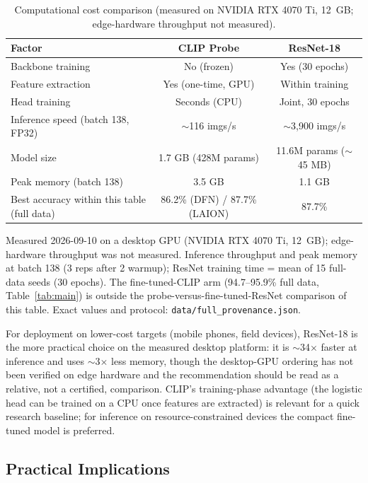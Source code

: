 \documentclass[10pt,a4paper]{article}
\begin{document}
\begin{table}[!ht]
\centering
\caption{Computational cost comparison (measured on NVIDIA RTX 4070 Ti, 12~GB; edge-hardware throughput not measured).}
\label{tab:cost}
\small
\begin{tabular}{lcc}
\toprule
\textbf{Factor} & \textbf{CLIP Probe} & \textbf{ResNet-18} \\
\midrule
Backbone training & No (frozen) & Yes (30 epochs) \\
Feature extraction & Yes (one-time, GPU) & Within training \\
Head training & Seconds (CPU) & Joint, 30 epochs \\
Inference speed (batch 138, FP32) & $\sim$116 imgs/s & $\sim$3{,}900 imgs/s \\
Model size & 1.7 GB (428M params) & 11.6M params ($\sim$45 MB) \\
Peak memory (batch 138) & 3.5 GB & 1.1 GB \\
\midrule
Best accuracy within this table (full data) & 86.2\% (DFN) / 87.7\% (LAION) & 87.7\% \\
\bottomrule
\end{tabular}
\smallskip
{\small Measured 2026-09-10 on a desktop GPU (NVIDIA RTX 4070 Ti, 12~GB); edge-hardware throughput was not measured. Inference throughput and peak memory at batch 138 (3 reps after 2 warmup); ResNet training time = mean of 15 full-data seeds (30 epochs). The fine-tuned-CLIP arm (94.7--95.9\% full data, Table~\ref{tab:main}) is outside the probe-versus-fine-tuned-ResNet comparison of this table. Exact values and protocol: \texttt{data/full\_provenance.json}.}
\end{table}

For deployment on lower-cost targets (mobile phones, field devices), ResNet-18 is the more practical choice on the measured desktop platform: it is $\sim$34$\times$ faster at inference and uses $\sim$3$\times$ less memory, though the desktop-GPU ordering has not been verified on edge hardware and the recommendation should be read as a relative, not a certified, comparison.
CLIP's training-phase advantage (the logistic head can be trained on a CPU once features are extracted) is relevant for a quick research baseline; for inference on resource-constrained devices the compact fine-tuned model is preferred.

\subsection{Practical Implications}
\label{sec:practical}
\end{document}
